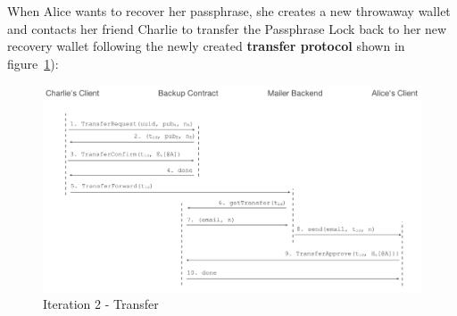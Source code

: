 \documentclass[runningheads]{llncs}
\begin{document}
When Alice wants to recover her passphrase, she creates a new throwaway wallet and contacts her friend Charlie to transfer the Passphrase Lock back to her new recovery wallet following the newly created {\bf transfer protocol} shown in figure~\ref{it2:transfer}):

\begin{figure}[t]
  \includegraphics[width=\linewidth]{./media/media-005.png}
  \caption{Iteration 2 - Transfer}
  \label{it2:transfer}
\end{figure} 
\end{document}
